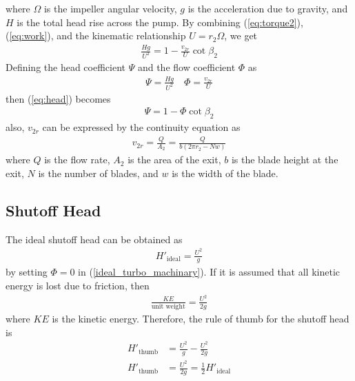 where $\Omega$ is the impeller angular velocity, $g$ is the acceleration due to gravity, and $H$ is the total head rise across the pump. By combining (\ref{eq:torque2}), (\ref{eq:work}), and the kinematic relationship $U = r_2 \Omega$, we get
\begin{align}
    \frac{Hg}{U^2} = 1 - \frac{v_{2r}}{U} \cot{\beta_2} \label{eq:head}
\end{align}
Defining the head coefficient $\Psi$ and the flow coefficient $\Phi$ as
\begin{align}
    \Psi = \frac{Hg}{U^2} \quad \Phi = \frac{v_{2r}}{U} \label{eq:coefficients}
\end{align}
then (\ref{eq:head}) becomes
\begin{align}
    \Psi = 1 - \Phi \cot{\beta_2} \label{ideal_turbo_machinary}
\end{align}
also, $v_{2r}$ can be expressed by the continuity equation as 
\begin{align}
    v_{2r} = \frac{Q}{A_2} = \frac{Q}{b(2\pi r_2 - N w)} \label{eq:v2r}
\end{align}
where $Q$ is the flow rate, $A_2$ is the area of the exit, $b$ is the blade height at the exit, $N$ is the number of blades, and $w$ is the width of the blade. 

\subsection{Shutoff Head}
The ideal shutoff head can be obtained as 
\begin{align*}
    H'_{\text{ideal}} = \frac{U^2}{g}
\end{align*}
by setting $\Phi = 0$ in (\ref{ideal_turbo_machinary}). If it is assumed that all kinetic energy is lost due to friction, then 
\begin{align*}
    \frac{KE}{\text{unit weight}} = \frac{U^2}{2g}
\end{align*}
where $KE$ is the kinetic energy. Therefore, the rule of thumb for the shutoff head is
\begin{align}
    H'_{\text{thumb}} &= \frac{U^2}{g} - \frac{U^2}{2g} \nonumber \\
    H'_{\text{thumb}} &= \frac{U^2}{2g} = \frac{1}{2} H'_{\text{ideal}} \label{eq:thumb_head}
\end{align}

